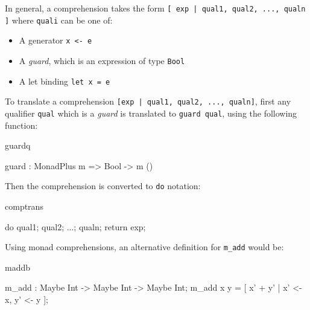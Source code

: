 \noindent
In general, a comprehension takes the form \texttt{[ exp | qual1, qual2, ..., qualn ]} where
\texttt{quali} can be one of:

\begin{itemize}
\item A generator \texttt{x <- e}
\item A \emph{guard}, which is an expression of type \texttt{Bool}
\item A let binding \texttt{let x = e}
\end{itemize}

\noindent
To translate a comprehension \texttt{[exp | qual1, qual2, ..., qualn]}, first
any qualifier
\texttt{qual} which is a \emph{guard} is translated to \texttt{guard qual}, using
the following function:

\begin{SaveVerbatim}{guardq}

guard : MonadPlus m => Bool -> m ()

\end{SaveVerbatim}

\noindent
Then the comprehension is converted to \texttt{do} notation:

\begin{SaveVerbatim}{comptrans}

do { qual1; qual2; ...; qualn; return exp; }

\end{SaveVerbatim}

\noindent
Using monad comprehensions, an alternative definition for \texttt{m\_add} would be:

\begin{SaveVerbatim}{maddb}

m_add : Maybe Int -> Maybe Int -> Maybe Int;
m_add x y = [ x' + y' | x' <- x, y' <- y ];
\end{SaveVerbatim}



